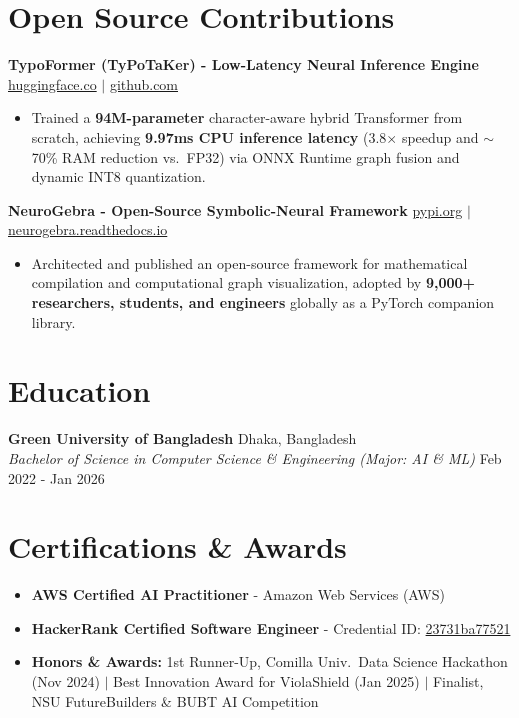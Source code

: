 \documentclass[9.5pt,a4paper]{article}
\begin{document}
\section*{Open Source Contributions}
\noindent
\textbf{TypoFormer (TyPoTaKer) - Low-Latency Neural Inference Engine} \hfill \href{https://huggingface.co/fahiiim/TypoFormer}{huggingface.co} $\vert$ \href{https://github.com/fahiiim/TyPoTaKer}{github.com}
\begin{itemize}
    \item Trained a \textbf{94M-parameter} character-aware hybrid Transformer from scratch, achieving \textbf{9.97ms CPU inference latency} (3.8$\times$ speedup and $\sim$70\% RAM reduction vs.\ FP32) via ONNX Runtime graph fusion and dynamic INT8 quantization.
\end{itemize}
\vspace{0.6pt}
\noindent
\textbf{NeuroGebra - Open-Source Symbolic-Neural Framework} \hfill \href{https://pypi.org/project/neurogebra/}{pypi.org} $\vert$ \href{https://neurogebra.readthedocs.io}{neurogebra.readthedocs.io}
\begin{itemize}
    \item Architected and published an open-source framework for mathematical compilation and computational graph visualization, adopted by \textbf{9,000+ researchers, students, and engineers} globally as a PyTorch companion library.
\end{itemize}
\vspace{0.6pt}

\section*{Education}
\noindent
\textbf{Green University of Bangladesh} \hfill Dhaka, Bangladesh\\
\textit{Bachelor of Science in Computer Science \& Engineering (Major: AI \& ML)} \hfill Feb 2022 - Jan 2026

\section*{Certifications \& Awards}
\begin{itemize}
    \item \textbf{AWS Certified AI Practitioner} - Amazon Web Services (AWS)
    \item \textbf{HackerRank Certified Software Engineer} - Credential ID: \href{https://www.hackerrank.com/certificates/23731ba77521}{23731ba77521}
    \item \textbf{Honors \& Awards:} 1st Runner-Up, Comilla Univ.\ Data Science Hackathon (Nov 2024) $\vert$ Best Innovation Award for ViolaShield (Jan 2025) $\vert$ Finalist, NSU FutureBuilders \& BUBT AI Competition
\end{itemize}
\end{document}
